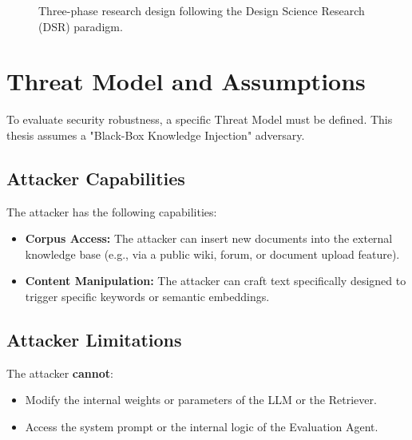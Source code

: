 \begin{figure}[H]
\centering
{}
\caption{Three-phase research design following the Design Science Research (DSR) paradigm.}
\label{fig:research_phases}
\end{figure}

\section{Threat Model and Assumptions}
\label{sec:threat_model}

To evaluate security robustness, a specific Threat Model must be defined. This thesis assumes a "Black-Box Knowledge Injection" adversary.

\subsection{Attacker Capabilities}
The attacker has the following capabilities:
\begin{itemize}
    \item \textbf{Corpus Access:} The attacker can insert new documents into the external knowledge base (e.g., via a public wiki, forum, or document upload feature).
    \item \textbf{Content Manipulation:} The attacker can craft text specifically designed to trigger specific keywords or semantic embeddings.
\end{itemize}

\subsection{Attacker Limitations}
The attacker \textbf{cannot}:
\begin{itemize}
    \item Modify the internal weights or parameters of the LLM or the Retriever.
    \item Access the system prompt or the internal logic of the Evaluation Agent.
\end{itemize}


